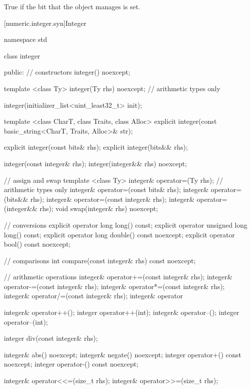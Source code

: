 \begin{itemdescr}
\returns True if the bit that the object manages is set.	
\end{itemdescr}

[numeric.integer.syn]{Integer}

\begin{codeblock}
namespace std {
  class integer {
  public:
    // constructors
    integer() noexcept;
    
    template <class Ty>
      integer(Ty rhs) noexcept; // arithmetic types only
    
    integer(initializer_list<uint_least32_t> init);
    
    template <class CharT, class Traits, class Alloc>
      explicit integer(const basic_string<CharT, Traits, Alloc>& str);
    
    explicit integer(const bits& rhs);
    explicit integer(bits&& rhs);
    
    integer(const integer& rhs);
    integer(integer&& rhs) noexcept;
    
    // assign and swap
    template <class Ty>
      integer& operator=(Ty rhs);   // arithmetic types only
    integer& operator=(const bits& rhs);
    integer& operator=(bits&& rhs);
    integer& operator=(const integer& rhs);
    integer& operator=(integer&& rhs);
    void swap(integer& rhs) noexcept;
    
    // conversions
    explicit operator long long() const;
    explicit operator unsigned long long() const;
    explicit operator long double() const noexcept;
    explicit operator bool() const noexcept;
    
    // comparisons
    int compare(const integer& rhs) const noexcept;
    
    // arithmetic operations
    integer& operator+=(const integer& rhs);
    integer& operator-=(const integer& rhs);
    integer& operator*=(const integer& rhs);
    integer& operator/=(const integer& rhs);
    integer& operator%
    
    integer& operator++();
    integer operator++(int);
    integer& operator--();
    integer operator--(int);
    
    integer div(const integer& rhs);
    
    integer& abs() noexcept;
    integer& negate() noexcept;
    integer operator+() const noexcept;
    integer operator-() const noexcept;
    
    integer& operator<<=(size_t rhs);
    integer& operator>>=(size_t rhs);
    
}}
\end{codeblock}
